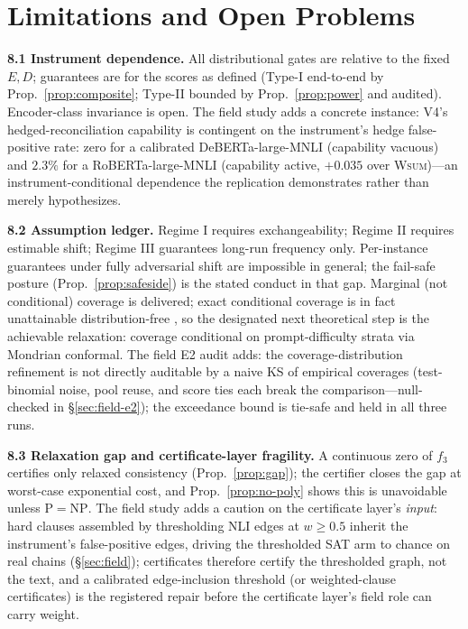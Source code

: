 \section{Limitations and Open Problems}
\label{sec:limitations}

\textbf{8.1 Instrument dependence.} All distributional gates are relative to
the fixed $E,D$; guarantees are for the scores as defined (Type-I end-to-end
by Prop.~\ref{prop:composite}; Type-II bounded by Prop.~\ref{prop:power} and
audited). Encoder-class invariance is open. The field study adds a concrete
instance: V4's hedged-reconciliation capability is contingent on the
instrument's hedge false-positive rate: zero for a calibrated
DeBERTa-large-MNLI (capability vacuous) and $2.3\%$ for a RoBERTa-large-MNLI
(capability active, $+0.035$ over \textsc{Wsum})---an instrument-conditional
dependence the replication demonstrates rather than merely hypothesizes.

\textbf{8.2 Assumption ledger.} Regime I requires exchangeability; Regime II
requires estimable shift; Regime III guarantees long-run frequency only.
Per-instance guarantees under fully adversarial shift are impossible in
general; the fail-safe posture (Prop.~\ref{prop:safeside}) is the stated
conduct in that gap. Marginal (not conditional) coverage is delivered;
exact conditional coverage is in fact unattainable distribution-free
\cite{barber2021}, so the designated next theoretical step is the achievable
relaxation: coverage conditional on prompt-difficulty strata via Mondrian
conformal. The field E2 audit adds: the
coverage-distribution refinement is not directly auditable by a naive KS of
empirical coverages (test-binomial noise, pool reuse, and score ties each
break the comparison---null-checked in \S\ref{sec:field-e2}); the exceedance
bound is tie-safe and held in all three runs.

\textbf{8.3 Relaxation gap and certificate-layer fragility.} A continuous
zero of $f_3$ certifies only relaxed consistency (Prop.~\ref{prop:gap}); the
certifier closes the gap at worst-case exponential cost, and
Prop.~\ref{prop:no-poly} shows this is unavoidable unless
$\mathrm P=\mathrm{NP}$. The field study adds a caution on the certificate
layer's \emph{input}: hard clauses assembled by thresholding NLI edges at
$w\ge 0.5$ inherit the instrument's false-positive edges, driving the
thresholded SAT arm to chance on real chains (\S\ref{sec:field}); certificates
therefore certify the thresholded graph, not the text, and a calibrated
edge-inclusion threshold (or weighted-clause certificates) is the registered
repair before the certificate layer's field role can carry weight.

